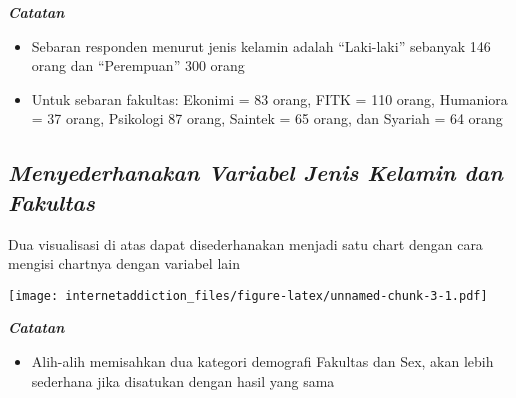 \documentclass[
]{article}
\newenvironment{Shaded}{\begin{snugshade}}{\end{snugshade}}
\newcommand{\CommentTok}[1]{\textcolor[rgb]{0.56,0.35,0.01}{\textit{#1}}}
\newcommand{\DataTypeTok}[1]{\textcolor[rgb]{0.13,0.29,0.53}{#1}}
\newcommand{\DecValTok}[1]{\textcolor[rgb]{0.00,0.00,0.81}{#1}}
\newcommand{\KeywordTok}[1]{\textcolor[rgb]{0.13,0.29,0.53}{\textbf{#1}}}
\newcommand{\NormalTok}[1]{#1}
\newcommand{\OperatorTok}[1]{\textcolor[rgb]{0.81,0.36,0.00}{\textbf{#1}}}
\newcommand{\StringTok}[1]{\textcolor[rgb]{0.31,0.60,0.02}{#1}}
\providecommand{\tightlist}{%
  \setlength{\itemsep}{0pt}\setlength{\parskip}{0pt}}
\begin{document}
\textbf{\emph{Catatan}}

\begin{itemize}
\tightlist
\item
  Sebaran responden menurut jenis kelamin adalah ``Laki-laki'' sebanyak
  146 orang dan ``Perempuan'' 300 orang
\item
  Untuk sebaran fakultas: Ekonimi = 83 orang, FITK = 110 orang,
  Humaniora = 37 orang, Psikologi 87 orang, Saintek = 65 orang, dan
  Syariah = 64 orang
\end{itemize}

\hypertarget{menyederhanakan-variabel-jenis-kelamin-dan-fakultas}{%
\subsection{\texorpdfstring{\emph{Menyederhanakan Variabel Jenis Kelamin
dan
Fakultas}}{Menyederhanakan Variabel Jenis Kelamin dan Fakultas}}\label{menyederhanakan-variabel-jenis-kelamin-dan-fakultas}}

Dua visualisasi di atas dapat disederhanakan menjadi satu chart dengan
cara mengisi chartnya dengan variabel lain

\begin{Shaded}
\end{Shaded}

\texttt{[image: internetaddiction\_files/figure-latex/unnamed-chunk-3-1.pdf]}

\textbf{\emph{Catatan}}

\begin{itemize}
\tightlist
\item
  Alih-alih memisahkan dua kategori demografi Fakultas dan Sex, akan
  lebih sederhana jika disatukan dengan hasil yang sama
\end{itemize}
\end{document}
